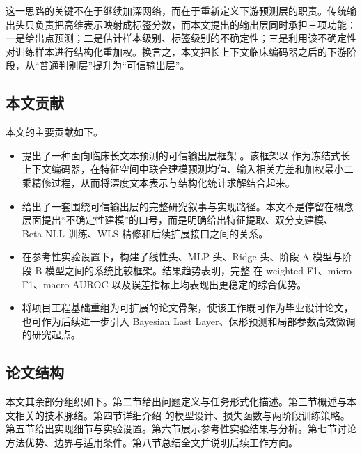 这一思路的关键不在于继续加深网络，而在于重新定义下游预测层的职责。传统输出头只负责把高维表示映射成标签分数，而本文提出的输出层同时承担三项功能：一是给出点预测；二是估计样本级别、标签级别的不确定性；三是利用该不确定性对训练样本进行结构化重加权。换言之，本文把长上下文临床编码器之后的下游阶段，从“普通判别层”提升为“可信输出层”。

\subsection{本文贡献}
本文的主要贡献如下。
\begin{itemize}[leftmargin=*, itemsep=2pt]
  \item 提出了一种面向临床长文本预测的可信输出层框架 \method{}。该框架以 \encoder{} 作为冻结式长上下文编码器，在特征空间中联合建模预测均值、输入相关方差和加权最小二乘精修过程，从而将深度文本表示与结构化统计求解结合起来。
  \item 给出了一套围绕可信输出层的完整研究叙事与实现路径。本文不是停留在概念层面提出“不确定性建模”的口号，而是明确给出特征提取、双分支建模、Beta-NLL 训练、WLS 精修和后续扩展接口之间的关系。
  \item 在参考性实验设置下，构建了线性头、MLP 头、Ridge 头、阶段 A 模型与阶段 B 模型之间的系统比较框架。结果趋势表明，完整 \method{} 在 weighted F1、micro F1、macro AUROC 以及误差指标上均表现出更稳定的综合优势。
  \item 将项目工程基础重组为可扩展的论文骨架，使该工作既可作为毕业设计论文，也可作为后续进一步引入 Bayesian Last Layer、保形预测和局部参数高效微调的研究起点。
\end{itemize}

\subsection{论文结构}
本文其余部分组织如下。第二节给出问题定义与任务形式化描述。第三节概述与本文相关的技术脉络。第四节详细介绍 \method{} 的模型设计、损失函数与两阶段训练策略。第五节给出实现细节与实验设置。第六节展示参考性实验结果与分析。第七节讨论方法优势、边界与适用条件。第八节总结全文并说明后续工作方向。
